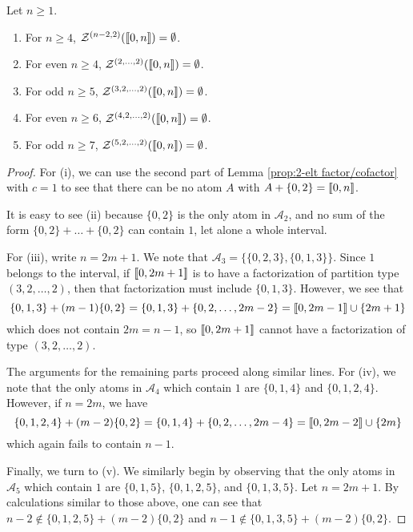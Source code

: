 \begin{prop} \label{prop:bad types}
	Let $n\ge 1$.
	\begin{enumerate}[label={\rm (\roman{*})}]
		\item For $n\ge 4$, $\mathcal{Z}^{(n-2,2)}(\llbracket 0,n \rrbracket) = \emptyset$.
		\item For even $n\ge 4$, $\mathcal{Z}^{(2,\dots,2)}(\llbracket 0,n \rrbracket) = \emptyset$.
		\item For odd $n\ge 5$, $\mathcal{Z}^{(3,2,\dots, 2)}(\llbracket 0,n \rrbracket) = \emptyset$.
		\item For even $n\ge 6$, $\mathcal{Z}^{(4,2,\dots, 2)}(\llbracket 0,n \rrbracket) = \emptyset$.
		\item For odd $n\ge 7$, $\mathcal{Z}^{(5,2,\dots, 2)}(\llbracket 0,n \rrbracket) = \emptyset$.
	\end{enumerate}
\end{prop}
\begin{proof}
	For (i), we can use the second part of Lemma \ref{prop:2-elt factor/cofactor} with $c = 1$ to see that there can be no atom $A$ with $A+\{0,2\} = \llbracket 0,n \rrbracket$.
	
	It is easy to see (ii) because $\{0,2\}$ is the only atom in $\mathcal{A}_2$, and no sum of the form $\{0,2\} +\dots +\{0,2\}$ can contain $1$, let alone a whole interval.
	
	For (iii), write $n = 2m+1$.
	We note that $\mathcal{A}_3 = \{\{0,2,3\}, \{0,1,3\} \}$.
	Since $1$ belongs to the interval, if $\llbracket 0,2m+1 \rrbracket$ is to have a factorization of partition type $(3,2,\dots,2)$, then that factorization must include $\{0,1,3\}$.
	However, we see that 
	\[ \{0,1,3\} + (m-1)\{0,2\}  = \{0,1,3\} + \{0,2,\dots, 2m-2\} = \llbracket 0, 2m-1 \rrbracket \cup \{2m+1\} \]
	which does not contain $2m = n-1$, so $\llbracket 0,2m+1\rrbracket$ cannot have a factorization of type $(3,2,\dots,2)$.
	
	The arguments for the remaining parts proceed along similar lines.
	For (iv), we note that the only atoms in $\mathcal{A}_4$ which contain $1$ are $\{0,1,4\}$ and $\{0,1,2,4\}$.
	However, if $n = 2m$, we have
	\[ \{0,1,2,4\} + (m-2)\{0,2\} = \{0,1,4\} + \{0,2,\dots, 2m-4\} = \llbracket 0, 2m-2 \rrbracket \cup \{2m\} \]
	which again fails to contain $n-1$.
	
	Finally, we turn to (v).
	We similarly begin by observing that the only atoms in $\mathcal{A}_5$ which contain $1$ are $\{0,1,5\}$, $\{0,1,2,5\}$, and $\{0,1,3,5\}$.
	Let $n = 2m+1$.
	By calculations similar to those above, one can see that $n-2 \notin \{0,1,2,5\} +(m-2)\{0,2\}$ and $n-1\notin \{0,1,3,5\} + (m-2)\{0,2\}$.
\end{proof}

